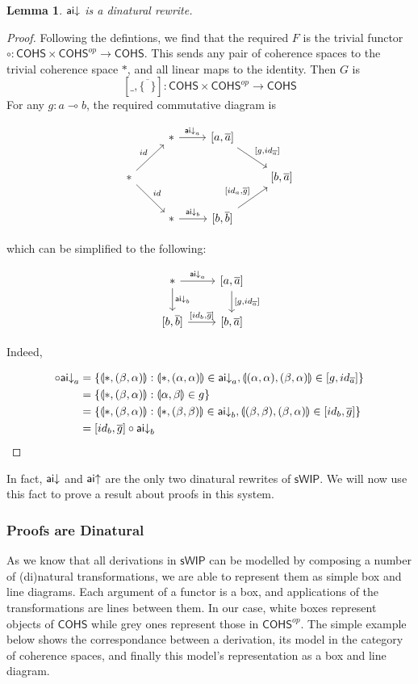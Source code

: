 \documentclass[11pt, oneside]{article}
\theoremstyle{plain}
\newtheorem{lemma}[theorem]{Lemma}
\theoremstyle{definition}
\newcommand{\lp}{\llparenthesis}
\newcommand{\rp}{\rrparenthesis}
\newcommand{\sSys}{{\mathsf{sWIP}}}%
\newcommand{\cohs}{{\mathsf{COHS}}}
\newcommand{\comp}{\mathbin{\circ}}
\newcommand{\unit}{\circ}
\begin{document}
\begin{lemma}
${\mathsf {ai}}{\downarrow}$ is a dinatural rewrite.
\end{lemma}
\begin{proof}
Following the defintions, we find that the required $F$ is the trivial functor $\unit:\cohs\times\cohs^{op}\to\cohs$.
This sends any pair of coherence spaces to the trivial coherence space $*$, and all linear maps to the identity.
Then $G$ is
$$[\_,\overline{\{\enspace\}}]:\cohs\times\cohs^{op}\to\cohs$$
For any $g:a\multimap b$, the required commutative diagram is

\[
\begin{tikzcd}
    & * \arrow[r,"\aiD_{a}"] & {[a,\overline{a}]} \arrow[rd,"{[g,id_{\overline{a}}]}"] \\
    * \arrow[ru,"id"] \arrow[rd,"id"] &&& {[b,\overline{a}]} \\
    & * \arrow[r,"\aiD_{b}"] & {[b,\overline{b}]} \arrow[ru,"{[id_a,\overline{g}]}"]
\end{tikzcd}
\]

which can be simplified to the following:

\[
\begin{tikzcd}
    * \arrow[r, "\aiD_{a}"]\arrow[d,"\aiD_{b}"] & {[a,\overline{a}]} \arrow[d,"{[g,id_{\overline{a}}]}"] \\
    {[b,\overline{b}]} \arrow[r,"{[id_b,\overline{g}]}"] & {[b,\overline{a}]}
\end{tikzcd}
\]

Indeed,

\begin{align*}
    [g,id_{\overline{a}}]\comp\aiD_{a} &= \{\lp*,(\beta,\alpha)\rp:\lp*,(\alpha,\alpha)\rp\in \aiD_{a},\lp(\alpha,\alpha),(\beta,\alpha)\rp\in[g,id_{\overline{a}}]\} \\
    &= \{\lp*,(\beta,\alpha)\rp:\lp\alpha,\beta\rp\in g\} \\
    &= \{\lp*,(\beta,\alpha)\rp:\lp*,(\beta,\beta)\rp\in \aiD_{b},\lp(\beta,\beta),(\beta,\alpha)\rp\in[id_{b},\overline{g}]\}\\
    &= [id_b,\overline{g}]\comp\aiD_{b}
\end{align*}
\end{proof}

In fact, ${\mathsf {ai}}{\downarrow}$ and ${\mathsf {ai}}{ \uparrow}$ are the only two dinatural rewrites of $\sSys$.
We will now use this fact to prove a result about proofs in this system.

\subsubsection{Proofs are Dinatural}
As we know that all derivations in $\sSys$ can be modelled by composing a number of (di)natural transformations, we are able to represent them as simple box and line diagrams.
Each argument of a functor is a box, and applications of the transformations are lines between them.
In our case, white boxes represent objects of $\cohs$ while grey ones represent those in $\cohs^{op}$.
The simple example below shows the correspondance between a derivation, its model in the category of coherence spaces, and finally this model's representation as a box and line diagram.
\end{document}
